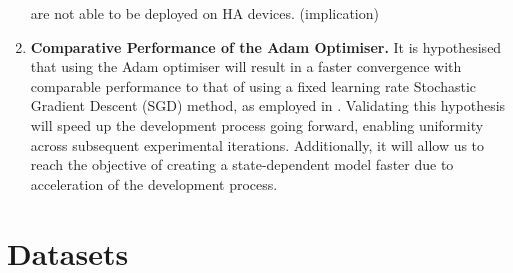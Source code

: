 \documentclass[logo,bsc,singlespacing,parskip,online]{infthesis}
\begin{document}
\begin{enumerate}
   are not able to be deployed on HA devices. (implication)
   \item \textbf{Comparative Performance of the Adam Optimiser.}
   It is hypothesised that using the Adam optimiser will result in a faster convergence with comparable performance to that of using a fixed learning rate Stochastic Gradient Descent (SGD) method, as employed in \citet{Huwel2020HearDS}.
   Validating this hypothesis will speed up the development process going forward, 
   enabling uniformity across subsequent experimental iterations. Additionally,
   it will allow us to reach the objective of creating a state-dependent model faster due to acceleration of the development process.
\end{enumerate}

\section{Datasets}
\label{sec:datasets}

\end{document}
